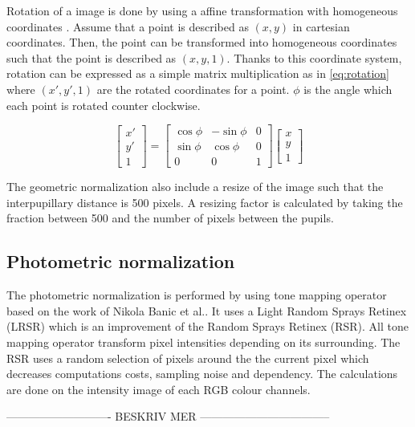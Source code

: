 Rotation of a image is done by using a affine transformation with homogeneous coordinates \cite{li2001generalized}. Assume that a point is described as $(x, y)$ in cartesian coordinates. Then, the point can be transformed into homogeneous coordinates such that the point is described as $(x, y, 1)$. Thanks to this coordinate system, rotation can be expressed as a simple matrix multiplication as in \cref{eq:rotation} where $(x', y', 1)$ are the rotated coordinates for a point. $\phi$ is the angle which each point is rotated counter clockwise. 

\begin{equation} \label{eq:rotation}
\begin{bmatrix}
x' \\[0.3em]
y' \\[0.3em]
1
\end{bmatrix}
=
\begin{bmatrix}
	\cos{\phi} & -\sin{\phi} & 0 \\[0.3em]
	\sin{\phi} & \cos{\phi}  & 0 \\[0.3em]
	0          & 0           & 1
\end{bmatrix}
\begin{bmatrix}
x \\[0.3em]
y \\[0.3em]
1
\end{bmatrix}
\end{equation}

The geometric normalization also include a resize of the image such that the interpupillary distance is 500 pixels. A resizing factor is calculated by taking the fraction between 500 and the number of pixels between the pupils.  

\subsection{Photometric normalization}

The photometric normalization is performed by using tone mapping operator based on the work of Nikola Banic et al.\cite{badger}. It uses a Light Random Sprays Retinex (LRSR) which is an improvement of the Random Sprays Retinex (RSR)\cite{RSR}. All tone mapping operator transform pixel intensities depending on its surrounding. The RSR uses a random selection of pixels around the the current pixel which decreases computations costs, sampling noise and dependency. The calculations are done on the intensity image of each RGB colour channels.

---------------------------- BESKRIV MER -----------------------------------

